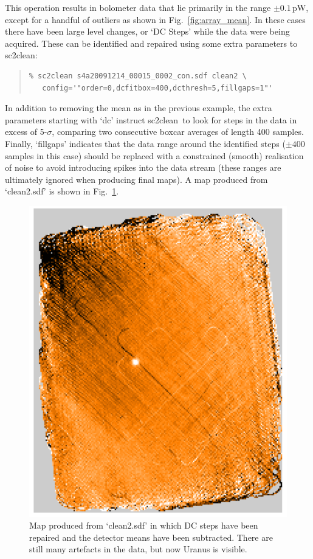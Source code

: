\documentclass[twoside,11pt]{article}
\newcommand{\xref}[3]{#1}
\renewcommand{\_}{\texttt{\symbol{95}}}
\newenvironment{myquote}{\begin{quote}\begin{small}}{\end{small}\end{quote}}
\newcommand{\task}[1]{\textsf{#1}}
\newcommand{\clean}{\xref{\task{sc2clean}}{sun258}{SC2CLEAN}}
\begin{document}
This operation results in bolometer data that lie primarily in the
range $\pm 0.1$\,pW, except for a handful of outliers as shown in
Fig.~\ref{fig:array_mean}. In these cases there have been large level
changes, or `DC Steps' while the data were being acquired. These can
be identified and repaired using some extra parameters to \clean:

\begin{myquote}
\begin{verbatim}
% sc2clean s4a20091214_00015_0002_con.sdf clean2 \
   config='"order=0,dcfitbox=400,dcthresh=5,fillgaps=1"'
\end{verbatim}
\end{myquote}

In addition to removing the mean as in the previous example, the extra
parameters starting with `dc' instruct \clean\ to look for steps in
the data in excess of 5-$\sigma$, comparing two consecutive boxcar
averages of length 400 samples.  Finally, `fillgaps' indicates that
the data range around the identified steps ($\pm 400$ samples in this
case) should be replaced with a constrained (smooth) realisation of
noise to avoid introducing spikes into the data stream (these ranges
are ultimately ignored when producing final maps). A map produced from
`clean2.sdf' is shown in Fig.~\ref{fig:map_dc_mean}.

\begin{figure}
\begin{center}
\includegraphics[width=0.5\linewidth]{sc19_map_mean_dc}
\caption{Map produced from `clean2.sdf' in which DC steps have been
  repaired and the detector means have been subtracted. There are
  still many artefacts in the data, but now Uranus is visible.}
\label{fig:map_dc_mean}
\end{center}
\end{figure}
\end{document}
